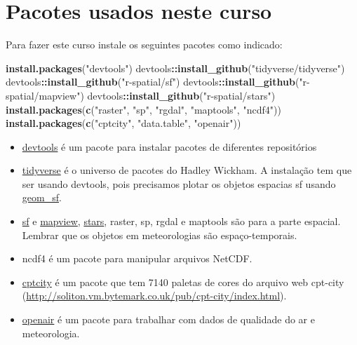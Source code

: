 \documentclass[]{book}
\newenvironment{Shaded}{\begin{snugshade}}{\end{snugshade}}
\newcommand{\KeywordTok}[1]{\textcolor[rgb]{0.13,0.29,0.53}{\textbf{#1}}}
\newcommand{\StringTok}[1]{\textcolor[rgb]{0.31,0.60,0.02}{#1}}
\newcommand{\OperatorTok}[1]{\textcolor[rgb]{0.81,0.36,0.00}{\textbf{#1}}}
\newcommand{\NormalTok}[1]{#1}
\providecommand{\tightlist}{%
  \setlength{\itemsep}{0pt}\setlength{\parskip}{0pt}}
\begin{document}
\section{Pacotes usados neste curso}\label{pacotes-usados-neste-curso}

Para fazer este curso instale os seguintes pacotes como indicado:

\begin{Shaded}
\begin{Highlighting}[]
\KeywordTok{install.packages}\NormalTok{(}\StringTok{"devtools"}\NormalTok{)}
\NormalTok{devtools}\OperatorTok{::}\KeywordTok{install_github}\NormalTok{(}\StringTok{"tidyverse/tidyverse"}\NormalTok{)}
\NormalTok{devtools}\OperatorTok{::}\KeywordTok{install_github}\NormalTok{(}\StringTok{"r-spatial/sf"}\NormalTok{)}
\NormalTok{devtools}\OperatorTok{::}\KeywordTok{install_github}\NormalTok{(}\StringTok{"r-spatial/mapview"}\NormalTok{)}
\NormalTok{devtools}\OperatorTok{::}\KeywordTok{install_github}\NormalTok{(}\StringTok{"r-spatial/stars"}\NormalTok{)}
\KeywordTok{install.packages}\NormalTok{(}\KeywordTok{c}\NormalTok{(}\StringTok{"raster"}\NormalTok{, }\StringTok{"sp"}\NormalTok{, }\StringTok{"rgdal"}\NormalTok{, }\StringTok{"maptools"}\NormalTok{, }\StringTok{"ncdf4"}\NormalTok{))}
\KeywordTok{install.packages}\NormalTok{(}\KeywordTok{c}\NormalTok{(}\StringTok{"cptcity"}\NormalTok{, }\StringTok{"data.table"}\NormalTok{, }\StringTok{"openair"}\NormalTok{))}
\end{Highlighting}
\end{Shaded}

\begin{itemize}
\tightlist
\item
  \href{https://CRAN.R-project.org/package=devtools}{devtools} é um
  pacote para instalar pacotes de diferentes repositórios
\item
  \href{https://github.com/tidyverse}{tidyverse} é o universo de pacotes
  do Hadley Wickham. A instalação tem que ser usando devtools, pois
  precisamos plotar os objetos espacias sf usando
  \href{https://www.isgeomsfinggplot2yet.site/}{geom\_sf}.
\item
  \href{https://github.com/r-spatial/sf}{sf} e
  \href{https://github.com/r-spatial/mapbiew}{mapview},
  \href{https://github.com/r-spatial/stars}{stars}, raster, sp, rgdal e
  maptools são para a parte espacial. Lembrar que os objetos em
  meteorologias são espaço-temporais.
\item
  ncdf4 é um pacote para manipular arquivos NetCDF.
\item
  \href{https://ibarraespinosa.github.io/cptcity/}{cptcity} é um pacote
  que tem 7140 paletas de cores do arquivo web cpt-city
  (\url{http://soliton.vm.bytemark.co.uk/pub/cpt-city/index.html}).
\item
  \href{http://davidcarslaw.github.io/openair/}{openair} é um pacote
  para trabalhar com dados de qualidade do ar e meteorologia.
\end{itemize}
\end{document}

